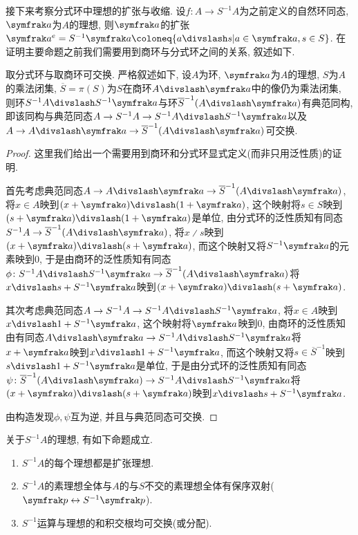 接下来考察分式环中理想的扩张与收缩. 设$f\colon A\to S^{-1}A$为之前定义的自然环同态, $\ideal{a}$为$A$的理想, 则$\ideal{a}$的扩张$\ideal{a}^e=S^{-1}\ideal{a}\coloneq \{a{\divslash}s\vert a\in\ideal{a}, s\in S\}$. 在证明主要命题之前我们需要用到商环与分式环之间的关系, 叙述如下.

\begin{proposition}\label{prop:localizationquotientcommute}
  取分式环与取商环可交换. 严格叙述如下, 设$A$为环, $\ideal{a}$为$A$的理想, $S$为$A$的乘法闭集, $\overline{S}=\pi(S)$为$S$在商环$A{\divslash}\ideal{a}$中的像仍为乘法闭集, 则环$\SASa$与环$\SAa$有典范同构, 即该同构与典范同态$A\to S^{-1}A\to \SASa$以及$A\to A{\divslash}\ideal{a}\to \SAa$可交换.
\end{proposition}

\begin{proof}
  这里我们给出一个需要用到商环和分式环显式定义(而非只用泛性质)的证明.

  首先考虑典范同态$A\to A{\divslash}\ideal{a}\to \SAa$, 将$x\in A$映到$(x+\ideal{a}){\divslash}(1+\ideal{a})$, 这个映射将$s\in S$映到$(s+\ideal{a}){\divslash}(1+\ideal{a})$是单位, 由分式环的泛性质知有同态$S^{-1}A\to \SAa$, 将$x{\divslash}s$映到$(x+\ideal{a}){\divslash}(s+\ideal{a})$, 而这个映射又将$S^{-1}\ideal{a}$的元素映到0, 于是由商环的泛性质知有同态$\phi\colon\SASa\to\SAa$将$x{\divslash}s + S^{-1}\ideal{a}$映到$(x+\ideal{a}){\divslash}(s+\ideal{a})$.

  其次考虑典范同态$A\to S^{-1}A\to\SASa$, 将$x\in A$映到$x{\divslash}1+S^{-1}\ideal{a}$, 这个映射将$\ideal{a}$映到0, 由商环的泛性质知由有同态$A{\divslash}\ideal{a}\to\SASa$将$x+\ideal{a}$映到$x{\divslash}1+S^{-1}\ideal{a}$, 而这个映射又将$s\in\overline{S}^{-1}$映到$s{\divslash}1+S^{-1}\ideal{a}$是单位, 于是由分式环的泛性质知有同态$\psi\colon\SAa\to\SASa$将$(x+\ideal{a}){\divslash}(s+\ideal{a})$映到$x{\divslash}s + S^{-1}\ideal{a}$.

  由构造发现$\phi, \psi$互为逆, 并且与典范同态可交换.
\end{proof}

\begin{proposition}\label{prop:fracideal}
  关于$S^{-1}A$的理想, 有如下命题成立.
  \begin{enumerate}
    \item\label{enum:prop-fracideal-1} $S^{-1}A$的每个理想都是扩张理想.
    \item\label{enum:prop-fracideal-2} $S^{-1}A$的素理想全体与$A$的与$S$不交的素理想全体有保序双射($\ideal{p}\leftrightarrow S^{-1}\ideal{p}$).
    \item\label{enum:prop-fracideal-3} $S^{-1}$运算与理想的和积交根均可交换(或分配). %
  \end{enumerate}
\end{proposition}

